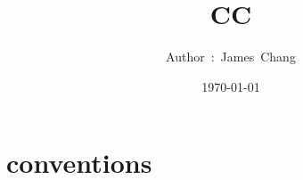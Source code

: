 

\title{CC}
\author{ {\Biohazard} \hspace{1.5mm} \hspace{1.5mm} Author\ :\ James\ Chang}
\date{\today}


\large

\tableofcontents

\chapter{conventions}





